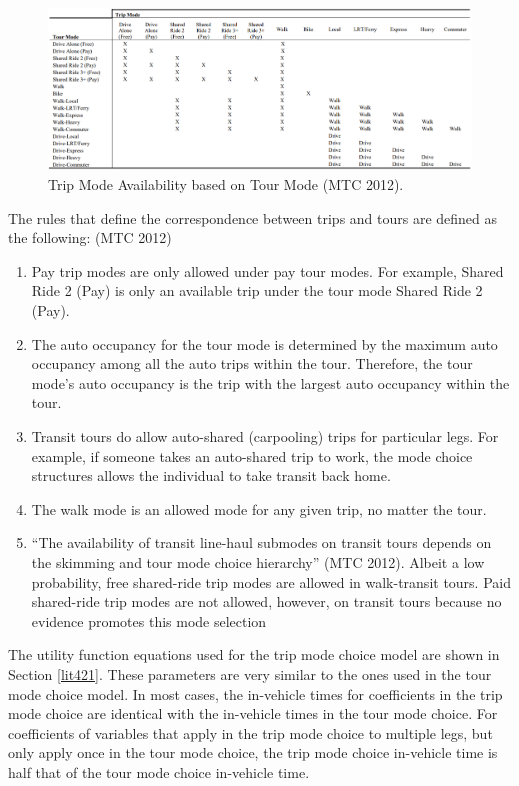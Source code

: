 \documentclass[12pt, oneside, openright]{byuthesis}
\begin{document}
\begin{figure}

{\centering \includegraphics[width=1\linewidth]{pics/trip_allow} 

}

\caption{Trip Mode Availability based on Tour Mode (MTC 2012).}\label{fig:fig2}
\end{figure}

The rules that define the correspondence between trips and tours are defined as the following: (MTC 2012)

\begin{enumerate}
\def\labelenumi{\arabic{enumi}.}
\item
  Pay trip modes are only allowed under pay tour modes. For example, Shared Ride 2 (Pay) is only an available trip under the tour mode Shared Ride 2 (Pay).
\item
  The auto occupancy for the tour mode is determined by the maximum auto occupancy among all the auto trips within the tour. Therefore, the tour mode's auto occupancy is the trip with the largest auto occupancy within the tour.
\item
  Transit tours do allow auto-shared (carpooling) trips for particular legs. For example, if someone takes an auto-shared trip to work, the mode choice structures allows the individual to take transit back home.
\item
  The walk mode is an allowed mode for any given trip, no matter the tour.
\item
  ``The availability of transit line-haul submodes on transit tours depends on the skimming and tour mode choice hierarchy'' (MTC 2012). Albeit a low probability, free shared-ride trip modes are allowed in walk-transit tours. Paid shared-ride trip modes are not allowed, however, on transit tours because no evidence promotes this mode selection
\end{enumerate}

The utility function equations used for the trip mode choice model are shown in Section \ref{lit421}. These parameters are very similar to the ones used in the tour mode choice model. In most cases, the in-vehicle times for coefficients in the trip mode choice are identical with the in-vehicle times in the tour mode choice. For coefficients of variables that apply in the trip mode choice to multiple legs, but only apply once in the tour mode choice, the trip mode choice in-vehicle time is half that of the tour mode choice in-vehicle time.
\end{document}
